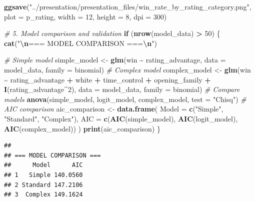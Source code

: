 \documentclass[
]{article}
\newenvironment{Shaded}{\begin{snugshade}}{\end{snugshade}}
\newcommand{\AttributeTok}[1]{\textcolor[rgb]{0.13,0.29,0.53}{#1}}
\newcommand{\CommentTok}[1]{\textcolor[rgb]{0.56,0.35,0.01}{\textit{#1}}}
\newcommand{\ControlFlowTok}[1]{\textcolor[rgb]{0.13,0.29,0.53}{\textbf{#1}}}
\newcommand{\DecValTok}[1]{\textcolor[rgb]{0.00,0.00,0.81}{#1}}
\newcommand{\FunctionTok}[1]{\textcolor[rgb]{0.13,0.29,0.53}{\textbf{#1}}}
\newcommand{\NormalTok}[1]{#1}
\newcommand{\OtherTok}[1]{\textcolor[rgb]{0.56,0.35,0.01}{#1}}
\newcommand{\SpecialCharTok}[1]{\textcolor[rgb]{0.81,0.36,0.00}{\textbf{#1}}}
\newcommand{\StringTok}[1]{\textcolor[rgb]{0.31,0.60,0.02}{#1}}
\begin{document}
\begin{Shaded}
\begin{Highlighting}[]
\FunctionTok{ggsave}\NormalTok{(}\StringTok{"../presentation/presentation\_files/win\_rate\_by\_rating\_category.png"}\NormalTok{, }\AttributeTok{plot =}\NormalTok{ p\_rating, }\AttributeTok{width =} \DecValTok{12}\NormalTok{, }\AttributeTok{height =} \DecValTok{8}\NormalTok{, }\AttributeTok{dpi =} \DecValTok{300}\NormalTok{)}

\CommentTok{\# 5. Model comparison and validation}
\ControlFlowTok{if}\NormalTok{ (}\FunctionTok{nrow}\NormalTok{(model\_data) }\SpecialCharTok{\textgreater{}} \DecValTok{50}\NormalTok{) \{}
  \FunctionTok{cat}\NormalTok{(}\StringTok{"}\SpecialCharTok{\textbackslash{}n}\StringTok{=== MODEL COMPARISON ===}\SpecialCharTok{\textbackslash{}n}\StringTok{"}\NormalTok{)}

  \CommentTok{\# Simple model}
\NormalTok{  simple\_model }\OtherTok{\textless{}{-}} \FunctionTok{glm}\NormalTok{(win }\SpecialCharTok{\textasciitilde{}}\NormalTok{ rating\_advantage, }\AttributeTok{data =}\NormalTok{ model\_data, }\AttributeTok{family =}\NormalTok{ binomial)}
  \CommentTok{\# Complex model}
\NormalTok{  complex\_model }\OtherTok{\textless{}{-}} \FunctionTok{glm}\NormalTok{(win }\SpecialCharTok{\textasciitilde{}}\NormalTok{ rating\_advantage }\SpecialCharTok{+}\NormalTok{ white }\SpecialCharTok{+}\NormalTok{ time\_control }\SpecialCharTok{+}\NormalTok{ opening\_family }\SpecialCharTok{+}
    \FunctionTok{I}\NormalTok{(rating\_advantage}\SpecialCharTok{\^{}}\DecValTok{2}\NormalTok{), }\AttributeTok{data =}\NormalTok{ model\_data, }\AttributeTok{family =}\NormalTok{ binomial)}
  \CommentTok{\# Compare models}
  \FunctionTok{anova}\NormalTok{(simple\_model, logit\_model, complex\_model, }\AttributeTok{test =} \StringTok{"Chisq"}\NormalTok{)}
  \CommentTok{\# AIC comparison}
\NormalTok{  aic\_comparison }\OtherTok{\textless{}{-}} \FunctionTok{data.frame}\NormalTok{(}
    \AttributeTok{Model =} \FunctionTok{c}\NormalTok{(}\StringTok{"Simple"}\NormalTok{, }\StringTok{"Standard"}\NormalTok{, }\StringTok{"Complex"}\NormalTok{),}
    \AttributeTok{AIC =} \FunctionTok{c}\NormalTok{(}\FunctionTok{AIC}\NormalTok{(simple\_model), }\FunctionTok{AIC}\NormalTok{(logit\_model), }\FunctionTok{AIC}\NormalTok{(complex\_model))}
\NormalTok{  )}
  \FunctionTok{print}\NormalTok{(aic\_comparison)}
\NormalTok{\}}
\end{Highlighting}
\end{Shaded}

\begin{verbatim}
## 
## === MODEL COMPARISON ===
##      Model      AIC
## 1   Simple 140.0560
## 2 Standard 147.2106
## 3  Complex 149.1624
\end{verbatim}
\end{document}
